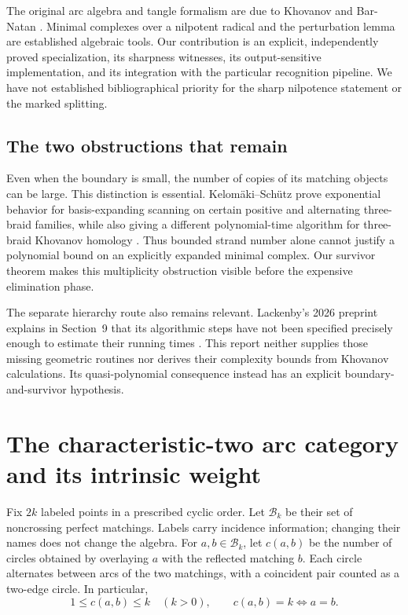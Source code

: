 \documentclass[11pt,letterpaper]{article}
\theoremstyle{definition}
\theoremstyle{remark}
\newcommand{\B}{\mathcal B}
\begin{document}
The original arc algebra and tangle formalism are due to Khovanov and Bar-Natan
\cite{khovanov,bn05,bn07}. Minimal complexes over a nilpotent radical and the
perturbation lemma are established algebraic tools. Our contribution is an
explicit, independently proved specialization, its sharpness witnesses, its
output-sensitive implementation, and its integration with the particular
recognition pipeline. We have not established bibliographical priority for the
sharp nilpotence statement or the marked splitting.

\subsection{The two obstructions that remain}
Even when the boundary is small, the number of copies of its matching objects
can be large. This distinction is essential. Kelom\"aki--Sch\"utz prove
exponential behavior for basis-expanding scanning on certain positive and
alternating three-braid families, while also giving a different polynomial-time
algorithm for three-braid Khovanov homology \cite{ks26}. Thus bounded strand
number alone cannot justify a polynomial bound on an explicitly expanded
minimal complex. Our survivor theorem makes this multiplicity obstruction
visible before the expensive elimination phase.

The separate hierarchy route also remains relevant. Lackenby's 2026 preprint
explains in Section~9 that its algorithmic steps have not been specified
precisely enough to estimate their running times \cite{lackenby}. This report
neither supplies those missing geometric routines nor derives their complexity
bounds from Khovanov calculations. Its quasi-polynomial consequence instead
has an explicit boundary-and-survivor hypothesis.

\section{The characteristic-two arc category and its intrinsic weight}
\label{sec:arc}
Fix $2k$ labeled points in a prescribed cyclic order. Let $\B_k$ be their set of
noncrossing perfect matchings. Labels carry incidence information; changing their
names does not change the algebra. For $a,b\in\B_k$, let $c(a,b)$ be the number
of circles obtained by overlaying $a$ with the reflected matching $b$.
Each circle alternates between arcs of the two matchings, with a coincident pair
counted as a two-edge circle. In particular,
\[
 1\leq c(a,b)\leq k\quad(k>0),\qquad c(a,b)=k\Longleftrightarrow a=b.
\]
\end{document}
